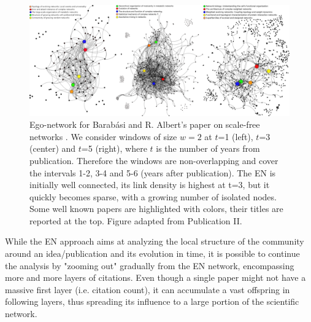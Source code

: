 \begin{figure}[htpb!]
\centering \large
\includegraphics[width=\linewidth]{Figures/EN.pdf}

\caption{Ego-network for Barab\'asi and
R. Albert's  paper on scale-free networks \cite{Barabasi509}. We consider windows of size $w=2$ at $t$=1 (left), $t$=3 (center)
and $t$=5 (right), where $t$ is the number of years from
publication. Therefore the windows are non-overlapping and cover the
intervals 1-2, 3-4 and 5-6 (years after publication).
The EN is initially well connected, its link density is highest at
t=3, but it quickly becomes sparse, with a growing number of isolated
nodes. Some well known papers are highlighted with colors, their
titles are reported at the top. Figure adapted from Publication II.}
\label{fig:EN}
\end{figure}

While the EN approach aims at analyzing the local structure of the community around an idea/publication and its evolution in time, it is possible to
continue the analysis by "zooming out" gradually from the EN network, encompassing more and more layers of citations.
Even though a single paper might not have a massive first layer (i.e. citation count), it can accumulate a vast offspring in following layers, thus spreading its influence
to a large portion of the scientific network. 


